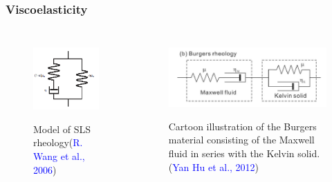 ﻿\documentclass{beamer}
\begin{document}
\begin{frame}
\frametitle{Viscoelasticity}

\begin{columns}[c] %

\begin{figure}
  \centering
  \includegraphics[scale=0.5]{./pic/sls_model.png}\\
  \caption{Model of SLS rheology(\textcolor{blue}{R. Wang et al., 2006})}\label{fig_okada}
\end{figure}

\begin{figure}
  \centering
  \includegraphics[scale=0.5]{./pic/Burgers.png}\\
  \caption{Cartoon illustration of the Burgers material consisting of the Maxwell fluid in series with the Kelvin solid.(\textcolor{blue}{Yan Hu et al., 2012})}\label{fig_okada}
\end{figure}

\end{columns}

\end{frame}
\end{document}
